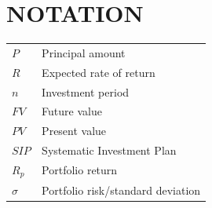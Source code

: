 \chapter*{\uppercase{NOTATION}}
%

\begin{tabular}{p{0.15\linewidth}p{0.85\linewidth}}
    $P$   & Principal amount \\
    $R$   & Expected rate of return \\
    $n$   & Investment period \\
    $FV$  & Future value \\
    $PV$  & Present value \\
    $SIP$ & Systematic Investment Plan \\
    $R_p$ & Portfolio return \\
    $\sigma$ & Portfolio risk/standard deviation \\
\end{tabular}
